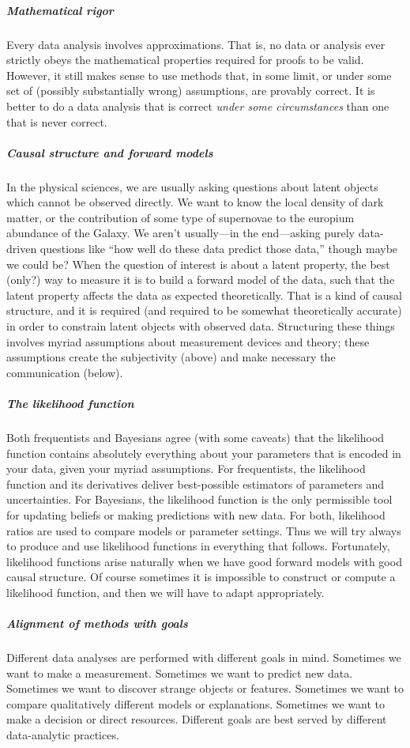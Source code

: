 \subparagraph{Mathematical rigor}
Every data analysis involves approximations.
That is, no data or analysis ever strictly obeys the mathematical properties required for proofs to be valid.
However, it still makes sense to use methods that, in some limit, or under some set of (possibly substantially wrong) assumptions, are provably correct.
It is better to do a data analysis that is correct \emph{under some circumstances} than one that is never correct.

\subparagraph{Causal structure and forward models}
In the physical sciences, we are usually asking questions about latent objects which cannot be observed directly.
We want to know the local density of dark matter, or the contribution of some type of supernovae to the europium abundance of the Galaxy.
We aren't usually---in the end---asking purely data-driven questions like ``how well do these data predict those data,'' though maybe we could be?
When the question of interest is about a latent property, the best (only?) way to measure it is to build a forward model of the data, such that the latent property affects the data as expected theoretically.
That is a kind of causal structure, and it is required (and required to be somewhat theoretically accurate) in order to constrain latent objects with observed data.
Structuring these things involves myriad assumptions about measurement devices and theory; these assumptions create the subjectivity (above) and make necessary the communication (below).

\subparagraph{The likelihood function}
Both frequentists and Bayesians agree (with some caveats) that the likelihood function contains absolutely everything about your parameters that is encoded in your data, given your myriad assumptions.
For frequentists, the likelihood function and its derivatives deliver best-possible estimators of parameters and uncertainties.
For Bayesians, the likelihood function is the only permissible tool for updating beliefs or making predictions with new data.
For both, likelihood ratios are used to compare models or parameter settings.
Thus we will try always to produce and use likelihood functions in everything that follows.
Fortunately, likelihood functions arise naturally when we have good forward models with good causal structure.
Of course sometimes it is impossible to construct or compute a likelihood function, and then we will have to adapt appropriately.

\subparagraph{Alignment of methods with goals}
Different data analyses are performed with different goals in mind.
Sometimes we want to make a measurement.
Sometimes we want to predict new data.
Sometimes we want to discover strange objects or features.
Sometimes we want to compare qualitatively different models or explanations.
Sometimes we want to make a decision or direct resources.
Different goals are best served by different data-analytic practices.

